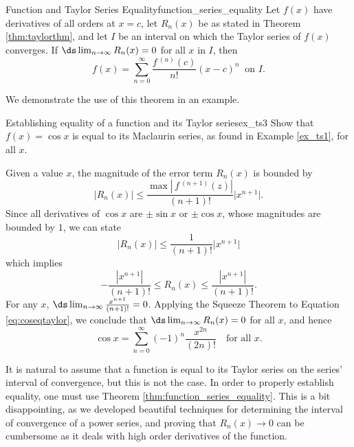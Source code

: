 \begin{theorem}{Function and Taylor Series Equality}{function_series_equality}
{Let $f(x)$ have derivatives of all orders at $x=c$, let $R_n(x)$ be as stated in Theorem \ref{thm:taylorthm}, and let $I$ be an interval on which the Taylor series of $f(x)$ converges. 
If $\ds\lim_{n\to\infty} R_n(x) = 0$ for all $x$ in $I$, then 
$$f(x) = \sum_{n=0}^\infty \frac{f\,^{(n)}(c)}{n!}(x-c)^n\ \text{ on $I$.}$$
}
\end{theorem}


We demonstrate the use of this theorem in an example.\\


\begin{example}{Establishing equality of a function and its Taylor series}{ex_ts3}
{Show that $f(x) = \cos x$ is equal to its Maclaurin series, as found in Example \ref{ex_ts1}, for all $x$. 
}
\end{example}


\begin{solution}
{Given a value $x$, the magnitude of the error term $R_n(x)$ is bounded by
$$ \big|R_n(x)\big| \leq \frac{\max\left|\,f\,^{(n+1)}(z)\right|}{(n+1)!}\big|x^{n+1}\big|.$$
Since all derivatives of $\cos x$ are $\pm \sin x$ or $\pm\cos x$, whose magnitudes are bounded by $1$, we can state
$$ \big|R_n(x)\big| \leq \frac{1}{(n+1)!}\big|x^{n+1}\big|$$
which implies
\begin{equation}
 -\frac{|x^{n+1}|}{(n+1)!} \leq R_n(x) \leq\frac{|x^{n+1}|}{(n+1)!}.\label{eq:coseqtaylor}
\end{equation}
For any $x$, $\ds\lim_{n\to\infty} \frac{x^{n+1}}{(n+1)!} = 0$. Applying the Squeeze Theorem to Equation \eqref{eq:coseqtaylor}, we conclude that $\ds \lim_{n\to\infty} R_n(x) = 0$ for all $x$, and hence
$$\cos x = \sum_{n=0}^\infty (-1)^{n}\frac{x^{2n}}{(2n)!}\quad \text{for all $x$}.$$
}
\end{solution}





%
It is natural to assume that a function is  equal to its Taylor series on the series' interval of convergence, but this is not the case. In order to properly establish equality, one must use Theorem \ref{thm:function_series_equality}. This is a bit disappointing, as we developed beautiful techniques for determining the interval of convergence of a power series, and proving that $R_n(x)\to 0$ can be cumbersome as it deals with high order derivatives of the function.

